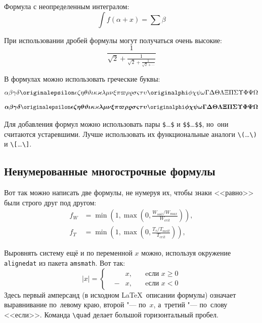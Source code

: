 Формула с неопределенным интегралом:
\[
    \int f(\alpha+x)=\sum\beta
\]

При использовании дробей формулы могут получаться очень высокие:
\[
    \frac{1}{\sqrt{2}+
        \displaystyle\frac{1}{\sqrt{2}+
            \displaystyle\frac{1}{\sqrt{2}+\cdots}}}
\]

В формулах можно использовать греческие буквы:
\[
    \alpha\beta\gamma\delta\originalepsilon\epsilon\zeta\eta\theta%
    \vartheta\iota\kappa\varkappa\lambda\mu\nu\xi\pi\varpi\rho\varrho%
    \sigma\varsigma\tau\upsilon\originalphi\phi\chi\psi\omega\Gamma\Delta%
    \Theta\Lambda\Xi\Pi\Sigma\Upsilon\Phi\Psi\Omega
\]
\[%
    \boldsymbol{\alpha\beta\gamma\delta\originalepsilon\epsilon\zeta\eta%
        \theta\vartheta\iota\kappa\varkappa\lambda\mu\nu\xi\pi\varpi\rho%
        \varrho\sigma\varsigma\tau\upsilon\originalphi\phi\chi\psi\omega\Gamma%
        \Delta\Theta\Lambda\Xi\Pi\Sigma\Upsilon\Phi\Psi\Omega}
\]

Для добавления формул можно использовать пары \verb+$+\dots\verb+$+ и \verb+$$+\dots\verb+$$+,
но~они считаются устаревшими.
Лучше использовать их функциональные аналоги \verb+\(+\dots\verb+\)+ и \verb+\[+\dots\verb+\]+.

\subsection{Ненумерованные многострочные формулы}\label{subsec:ch5/sec2/sub2}

Вот так можно написать две формулы, не нумеруя их, чтобы знаки <<равно>> были
строго друг под другом:
\begin{align}
    f_W & =  \min \left( 1, \max \left( 0, \frac{W_{soil} / W_{max}}{W_{crit}} \right)  \right), \nonumber \\
    f_T & =  \min \left( 1, \max \left( 0, \frac{T_s / T_{melt}}{T_{crit}} \right)  \right), \nonumber
\end{align}

Выровнять систему ещё и по переменной \( x \) можно, используя окружение
\verb|alignedat| из пакета \verb|amsmath|. Вот так:
\[
|x| = \left\{
\begin{alignedat}{2}
     &   & x, \quad & \text{eсли } x\geqslant 0 \\
     & - & x, \quad & \text{eсли } x<0
\end{alignedat}
\right.
\]
Здесь первый амперсанд (в исходном \LaTeX\ описании формулы) означает
выравнивание по~левому краю, второй "--- по~\( x \), а~третий "--- по~слову
<<если>>. Команда \verb|\quad| делает большой горизонтальный пробел.

